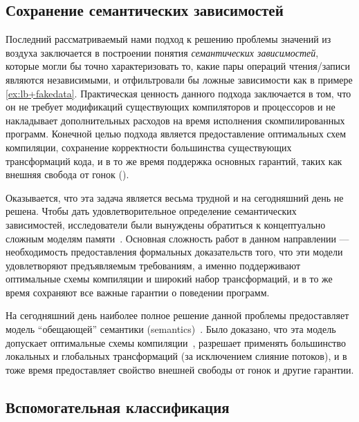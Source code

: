 \subsection{Сохранение семантических зависимостей}
\label{sec:analysis:sdeprf}

Последний рассматриваемый нами подход к решению проблемы значений из воздуха 
заключается в построении понятия \emph{семантических зависимостей}, 
которые могли бы точно характеризовать то, какие пары операций чтения/записи
являются независимыми, и отфильтровали бы ложные зависимости 
как в примере \ref{ex:lb+fakedata}.
Практическая ценность данного подхода заключается в том, что 
он не требует модификаций существующих компиляторов 
и процессоров и не накладывает дополнительных 
расходов на время исполнения скомпилированных программ. 
Конечной целью подхода является предоставление оптимальных схем компиляции, 
сохранение корректности большинства существующих трансформаций кода, 
и в то же время поддержка основных гарантий, 
таких как внешняя свобода от гонок (\eDRF).

Оказывается, что эта задача является весьма трудной 
и на сегодняшний день не решена. 
Чтобы дать удовлетворительное определение семантических зависимостей, 
исследователи были вынуждены  обратиться к концептуально 
сложным моделям памяти~\cite{Jagadeesan-al:ESOP10, Kang-al:POPL17, 
Jeffrey-Riely:LICS16, PichonPharabod-Sewell:POPL16, 
Chakraborty-Vafeiadis:POPL19, Paviotti-al:ESOP20}.
Основная сложность работ в данном направлении --- 
необходимость предоставления формальных доказательств того, 
что эти модели удовлетворяют предъявляемым требованиям, 
а именно поддерживают оптимальные схемы компиляции
и широкий набор трансформаций, и в то же 
время сохраняют все важные гарантии о поведении программ. 

На сегодняшний день наиболее полное решение  данной
проблемы  предоставляет модель  ``обещающей'' семантики 
(\Promising semantics)~\cite{Kang-al:POPL17, Lee-al:PLDI20}. 
Было доказано, что эта модель допускает 
оптимальные схемы компиляции~\cite{Podkopaev-al:POPL19}, 
разрешает применять большинство локальных и глобальных 
трансформаций (за исключением слияние потоков), 
и в тоже время предоставляет 
свойство внешней свободы от гонок и другие гарантии. 

\subsection{Вспомогательная классификация}
\label{sec:analysis:other}

